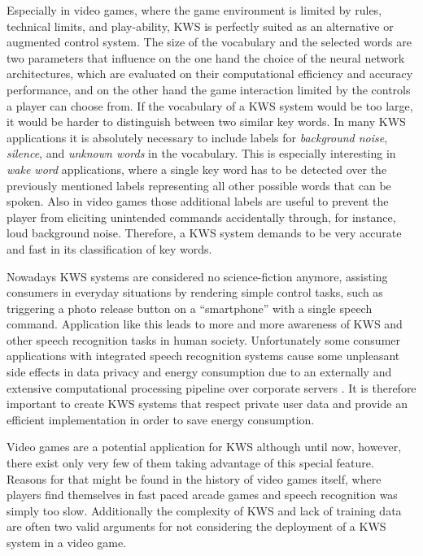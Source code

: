 Especially in video games, where the game environment is limited by rules, technical limits, and play-ability, KWS is perfectly suited as an alternative or augmented control system.
The size of the vocabulary and the selected words are two parameters that influence on the one hand the choice of the neural network architectures, which are evaluated on their computational efficiency and accuracy performance, and on the other hand the game interaction limited by the controls a player can choose from.
If the vocabulary of a KWS system would be too large, it would be harder to distinguish between two similar key words.
In many KWS applications it is absolutely necessary to include labels for \emph{background noise}, \emph{silence}, and \emph{unknown words} in the vocabulary. 
This is especially interesting in \emph{wake word} applications, where a single key word has to be detected over the previously mentioned labels representing all other possible words that can be spoken.
Also in video games those additional labels are useful to prevent the player from eliciting unintended commands accidentally through, for instance, loud background noise.
Therefore, a KWS system demands to be very accurate and fast in its classification of key words.

Nowadays KWS systems are considered no science-fiction anymore, assisting consumers in everyday situations by rendering simple control tasks, such as triggering a photo release button on a \enquote{smartphone} with a single speech command.
Application like this leads to more and more awareness of KWS and other speech recognition tasks in human society.
Unfortunately some consumer applications with integrated speech recognition systems cause some unpleasant side effects in data privacy and energy consumption due to an externally and extensive computational processing pipeline over corporate servers \cite{Tang2018}.
It is therefore important to create KWS systems that respect private user data and provide an efficient implementation in order to save energy consumption.

Video games are a potential application for KWS although until now, however, there exist only very few of them taking advantage of this special feature.
Reasons for that might be found in the history of video games itself, where players find themselves in fast paced arcade games and speech recognition was simply too slow.
Additionally the complexity of KWS and lack of training data are often two valid arguments for not considering the deployment of a KWS system in a video game.

